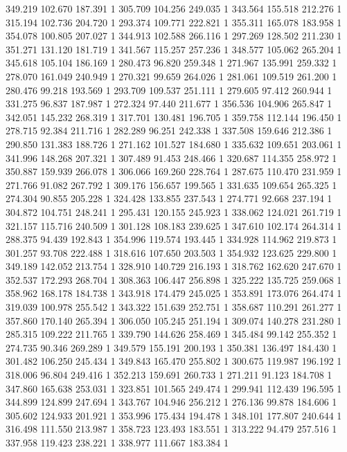 	349.219	102.670	187.391	1
	305.709	104.256	249.035	1
	343.564	155.518	212.276	1
	315.194	102.736	204.720	1
	293.374	109.771	222.821	1
	355.311	165.078	183.958	1
	354.078	100.805	207.027	1
	344.913	102.588	266.116	1
	297.269	128.502	211.230	1
	351.271	131.120	181.719	1
	341.567	115.257	257.236	1
	348.577	105.062	265.204	1
	345.618	105.104	186.169	1
	280.473	96.820	259.348	1
	271.967	135.991	259.332	1
	278.070	161.049	240.949	1
	270.321	99.659	264.026	1
	281.061	109.519	261.200	1
	280.476	99.218	193.569	1
	293.709	109.537	251.111	1
	279.605	97.412	260.944	1
	331.275	96.837	187.987	1
	272.324	97.440	211.677	1
	356.536	104.906	265.847	1
	342.051	145.232	268.319	1
	317.701	130.481	196.705	1
	359.758	112.144	196.450	1
	278.715	92.384	211.716	1
	282.289	96.251	242.338	1
	337.508	159.646	212.386	1
	290.850	131.383	188.726	1
	271.162	101.527	184.680	1
	335.632	109.651	203.061	1
	341.996	148.268	207.321	1
	307.489	91.453	248.466	1
	320.687	114.355	258.972	1
	350.887	159.939	266.078	1
	306.066	169.260	228.764	1
	287.675	110.470	231.959	1
	271.766	91.082	267.792	1
	309.176	156.657	199.565	1
	331.635	109.654	265.325	1
	274.304	90.855	205.228	1
	324.428	133.855	237.543	1
	274.771	92.668	237.194	1
	304.872	104.751	248.241	1
	295.431	120.155	245.923	1
	338.062	124.021	261.719	1
	321.157	115.716	240.509	1
	301.128	108.183	239.625	1
	347.610	102.174	264.314	1
	288.375	94.439	192.843	1
	354.996	119.574	193.445	1
	334.928	114.962	219.873	1
	301.257	93.708	222.488	1
	318.616	107.650	203.503	1
	354.932	123.625	229.800	1
	349.189	142.052	213.754	1
	328.910	140.729	216.193	1
	318.762	162.620	247.670	1
	352.537	172.293	268.704	1
	308.363	106.447	256.898	1
	325.222	135.725	259.068	1
	358.962	168.178	184.738	1
	343.918	174.479	245.025	1
	353.891	173.076	264.474	1
	319.039	100.978	255.542	1
	343.322	151.639	252.751	1
	358.687	110.291	261.277	1
	357.860	170.140	265.394	1
	306.050	105.245	251.194	1
	309.074	140.278	231.280	1
	285.315	109.222	211.765	1
	339.790	144.626	258.469	1
	345.484	99.142	255.352	1
	274.735	90.346	269.289	1
	349.579	155.191	200.193	1
	350.381	136.497	184.430	1
	301.482	106.250	245.434	1
	349.843	165.470	255.802	1
	300.675	119.987	196.192	1
	318.006	96.804	249.416	1
	352.213	159.691	260.733	1
	271.211	91.123	184.708	1
	347.860	165.638	253.031	1
	323.851	101.565	249.474	1
	299.941	112.439	196.595	1
	344.899	124.899	247.694	1
	343.767	104.946	256.212	1
	276.136	99.878	184.606	1
	305.602	124.933	201.921	1
	353.996	175.434	194.478	1
	348.101	177.807	240.644	1
	316.498	111.550	213.987	1
	358.723	123.493	183.551	1
	313.222	94.479	257.516	1
	337.958	119.423	238.221	1
	338.977	111.667	183.384	1
